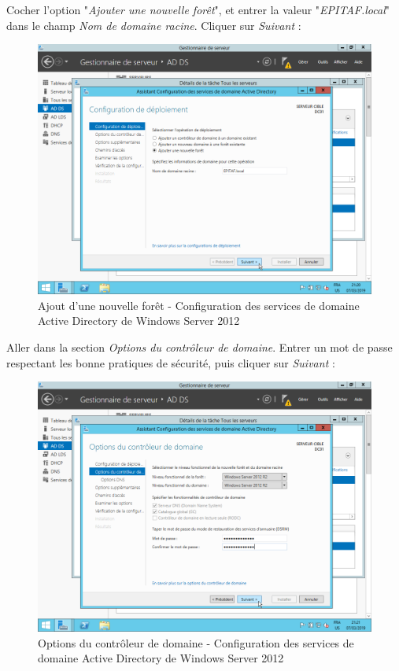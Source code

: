 \newpage
Cocher l'option "\textit{Ajouter une nouvelle forêt}", et entrer la valeur "\textit{EPITAF.local}" dans le champ \textit{Nom de domaine racine}. Cliquer sur \textit{Suivant} :
\begin{figure}[h!]
    \begin{center}
        \includegraphics[scale=0.6]{WS2012_Screenshots/58.png}
        \caption{Ajout d'une nouvelle forêt - Configuration des services de domaine Active Directory de Windows Server 2012}
        \label{WS2012_Screenshots/58}
    \end{center}
\end{figure}
\FloatBarrier

\newpage
Aller dans la section \textit{Options du contrôleur de domaine}. Entrer un mot de passe respectant les bonne pratiques de sécurité, puis cliquer sur \textit{Suivant} :
\begin{figure}[h!]
    \begin{center}
        \includegraphics[scale=0.6]{WS2012_Screenshots/59.png}
        \caption{Options du contrôleur de domaine - Configuration des services de domaine Active Directory de Windows Server 2012}
        \label{WS2012_Screenshots/59}
    \end{center}
\end{figure}
\FloatBarrier

